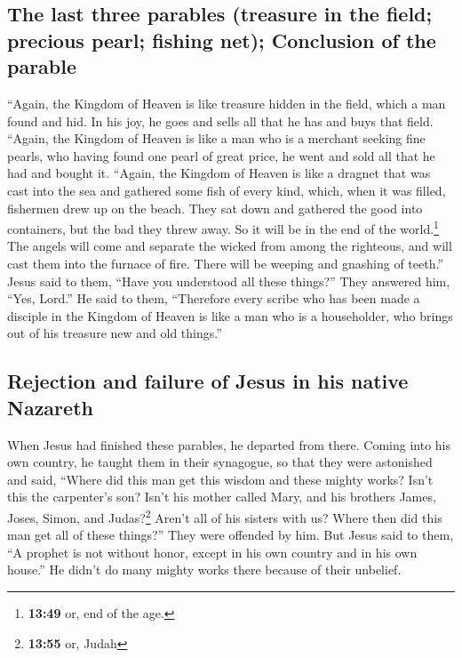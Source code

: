 \hypertarget{the-last-three-parables-treasure-in-the-field-precious-pearl-fishing-net-conclusion-of-the-parable}{%
\subsection{The last three parables (treasure in the field; precious
pearl; fishing net); Conclusion of the
parable}\label{the-last-three-parables-treasure-in-the-field-precious-pearl-fishing-net-conclusion-of-the-parable}}

 ``Again, the Kingdom of Heaven is like treasure hidden
in the field, which a man found and hid. In his joy, he goes and sells
all that he has and buys that field.  ``Again, the
Kingdom of Heaven is like a man who is a merchant seeking fine pearls,
 who having found one pearl of great price, he went and
sold all that he had and bought it.  ``Again, the Kingdom
of Heaven is like a dragnet that was cast into the sea and gathered some
fish of every kind,  which, when it was filled, fishermen
drew up on the beach. They sat down and gathered the good into
containers, but the bad they threw away.  So it will be
in the end of the world.\footnote{\textbf{13:49} or, end of the age.}
The angels will come and separate the wicked from among the righteous,
 and will cast them into the furnace of fire. There will
be weeping and gnashing of teeth.''  Jesus said to them,
``Have you understood all these things?'' They answered him, ``Yes,
Lord.''  He said to them, ``Therefore every scribe who
has been made a disciple in the Kingdom of Heaven is like a man who is a
householder, who brings out of his treasure new and old things.''

\hypertarget{rejection-and-failure-of-jesus-in-his-native-nazareth}{%
\subsection{Rejection and failure of Jesus in his native
Nazareth}\label{rejection-and-failure-of-jesus-in-his-native-nazareth}}

 When Jesus had finished these parables, he departed from
there.  Coming into his own country, he taught them in
their synagogue, so that they were astonished and said, ``Where did this
man get this wisdom and these mighty works?  Isn't this
the carpenter's son? Isn't his mother called Mary, and his brothers
James, Joses, Simon, and Judas?\footnote{\textbf{13:55} or, Judah}
 Aren't all of his sisters with us? Where then did this
man get all of these things?''  They were offended by
him. But Jesus said to them, ``A prophet is not without honor, except in
his own country and in his own house.''  He didn't do
many mighty works there because of their unbelief.

